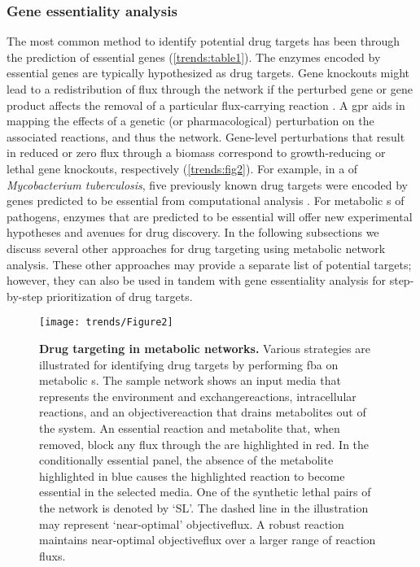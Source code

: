\subsubsection{Gene essentiality analysis}
The most common method to identify potential drug targets has been 
through the prediction of essential genes (\autoref{trends:table1}). The enzymes 
encoded by essential genes are typically hypothesized as drug targets. 
Gene knockouts might lead to a redistribution of \gls{flux} through the 
network if the perturbed gene or gene product affects the removal 
of a particular \gls{flux}-carrying reaction \cite{Oberhardt:2009jw}. A \gls{gpr} aids in mapping 
the effects of a genetic (or pharmacological) perturbation on the 
associated reactions, and thus the network. Gene-level perturbations 
that result in reduced or zero \gls{flux} through a \gls{biomass} 
correspond to growth-reducing or lethal gene knockouts, 
respectively (\autoref{trends:fig2}). For example, in a  of 
\textit{Mycobacterium tuberculosis}, five previously known drug targets 
were encoded by genes predicted to be essential from computational 
analysis \cite{Beste:2007bi}. For metabolic s of pathogens, 
enzymes that are predicted to be essential will offer new 
experimental hypotheses and avenues for drug discovery. In the 
following subsections we discuss several other approaches for 
drug targeting using metabolic network analysis. These other 
approaches may provide a separate list of potential 
targets; however, they can also be used in tandem with 
gene essentiality analysis for step-by-step prioritization 
of drug targets.

\begin{figure}[h!]
  \centering
  \texttt{[image: trends/Figure2]}
  \caption[Drug targeting in metabolic networks]{
       \textbf{Drug targeting in metabolic networks.}
       Various strategies are illustrated for identifying drug 
       targets by performing \gls{fba} on metabolic s. 
       The sample network shows an input media that represents 
       the environment and \glspl{exchangereaction}, intracellular 
       reactions, and an \gls{objectivereaction} that drains metabolites 
       out of the system. An essential reaction and metabolite 
       that, when removed, block any \gls{flux} through the  
       are highlighted in red. In the conditionally essential 
       panel, the absence of the metabolite highlighted in blue 
       causes the highlighted reaction to become essential in 
       the selected media. One of the synthetic lethal pairs 
       of the network is denoted by `SL'. The dashed line in 
       the  illustration may represent `near-optimal'
       \gls{objectiveflux}. A robust reaction maintains near-optimal 
       \gls{objectiveflux} over a larger range of reaction \glspl{flux}.
  }
  \label{trends:fig2}
\end{figure}


